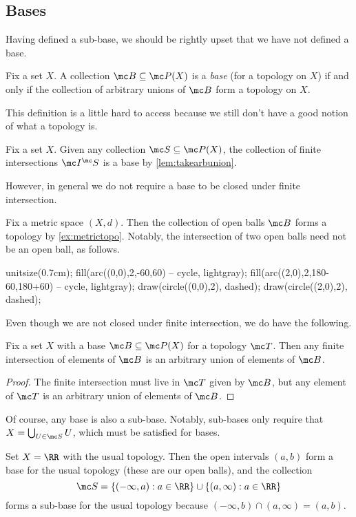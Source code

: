 \documentclass[../notes.tex]{subfiles}
\begin{document}
\subsection{Bases}
Having defined a sub-base, we should be rightly upset that we have not defined a base.
\begin{definition}[Base]
	Fix a set $X$. A collection $\mc B\subseteq\mc P(X)$ is a \textit{base} (for a topology on $X$) if and only if the collection of arbitrary unions of $\mc B$ form a topology on $X$.
\end{definition}
This definition is a little hard to access because we still don't have a good notion of what a topology is.
\begin{example}
	Fix a set $X$. Given any collection $\mc S\subseteq\mc P(X)$, the collection of finite intersections $\mc I^\mc S$ is a base by \autoref{lem:takearbunion}.
\end{example}
However, in general we do not require a base to be closed under finite intersection.
\begin{example}
	Fix a metric space $(X,d)$. Then the collection of open balls $\mc B$ forms a topology by \autoref{ex:metrictopo}. Notably, the intersection of two open balls need not be an open ball, as follows.
	\begin{center}
		\begin{asy}
			unitsize(0.7cm);
			fill(arc((0,0),2,-60,60) -- cycle, lightgray);
			fill(arc((2,0),2,180-60,180+60) -- cycle, lightgray);
			draw(circle((0,0),2), dashed);
			draw(circle((2,0),2), dashed);
		\end{asy}
	\end{center}
\end{example}
Even though we are not closed under finite intersection, we do have the following.
\begin{lemma}
	Fix a set $X$ with a base $\mc B\subseteq\mc P(X)$ for a topology $\mc T$. Then any finite intersection of elements of $\mc B$ is an arbitrary union of elements of $\mc B$.
\end{lemma}
\begin{proof}
	The finite intersection must live in $\mc T$ given by $\mc B$, but any element of $\mc T$ is an arbitrary union of elements of $\mc B$.
\end{proof}
\begin{remark}
	Of course, any base is also a sub-base. Notably, sub-bases only require that $X=\bigcup_{U\in\mc S}U$, which must be satisfied for bases.
\end{remark}
\begin{example}
	Set $X=\RR$ with the usual topology. Then the open intervals $(a,b)$ form a base for the usual topology (these are our open balls), and the collection
	\[\mc S=\{(-\infty,a):a\in\RR\}\cup\{(a,\infty):a\in\RR\}\]
	forms a sub-base for the usual topology because $(-\infty,b)\cap(a,\infty)=(a,b)$.
\end{example}
\end{document}
